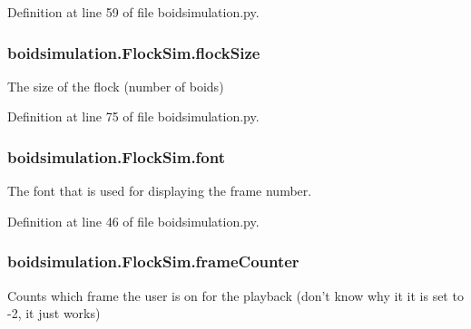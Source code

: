 Definition at line 59 of file boidsimulation.\-py.

\hypertarget{classboidsimulation_1_1FlockSim_a125fa6c2909527f18c768f09606ab442}{
\subsubsection[{flock\-Size}]{\setlength{\rightskip}{0pt plus 5cm}boidsimulation.\-Flock\-Sim.\-flock\-Size}}\label{classboidsimulation_1_1FlockSim_a125fa6c2909527f18c768f09606ab442}


The size of the flock (number of boids) 



Definition at line 75 of file boidsimulation.\-py.

\hypertarget{classboidsimulation_1_1FlockSim_aa5993f8033dcbbb0383c204877d1dd20}{
\subsubsection[{font}]{\setlength{\rightskip}{0pt plus 5cm}boidsimulation.\-Flock\-Sim.\-font}}\label{classboidsimulation_1_1FlockSim_aa5993f8033dcbbb0383c204877d1dd20}


The font that is used for displaying the frame number. 



Definition at line 46 of file boidsimulation.\-py.

\hypertarget{classboidsimulation_1_1FlockSim_a7daba8b4e771dcd6f6a7357bda59c56a}{
\subsubsection[{frame\-Counter}]{\setlength{\rightskip}{0pt plus 5cm}boidsimulation.\-Flock\-Sim.\-frame\-Counter}}\label{classboidsimulation_1_1FlockSim_a7daba8b4e771dcd6f6a7357bda59c56a}


Counts which frame the user is on for the playback (don't know why it it is set to -\/2, it just works) 



